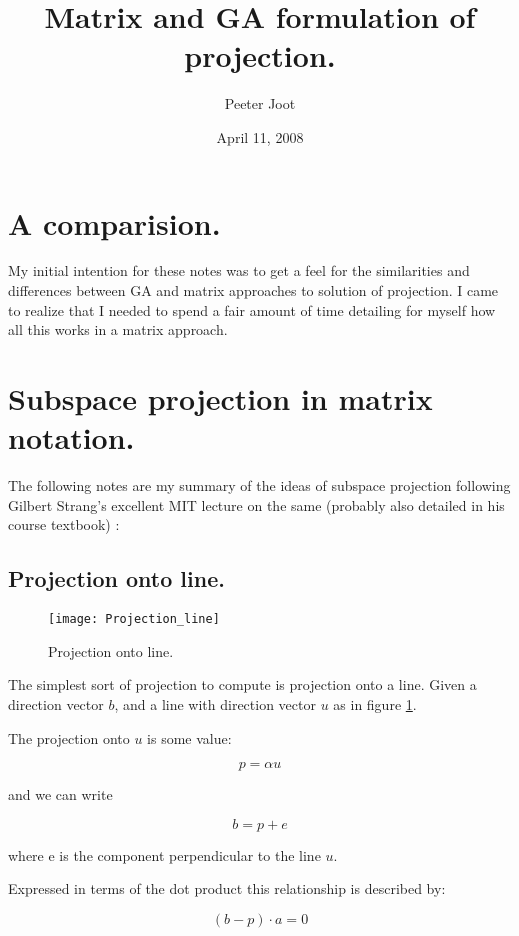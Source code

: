 \documentclass{article}      %
\title{ Matrix and GA formulation of projection. } %
\author{Peeter Joot}         %
\date{ April 11, 2008 }        %
\begin{document}

\maketitle{}

\section{ A comparision. }

My initial intention for these notes was to 
get a feel for the similarities and differences between GA and matrix approaches to solution of projection.  I came to realize that
I needed to spend a fair amount of time detailing for myself how all this works in a matrix approach.

\section{ Subspace projection in matrix notation. }

The following notes are my summary of the ideas of subspace projection following 
Gilbert Strang's excellent MIT lecture on the same (probably also detailed in his course textbook) :

\subsection{ Projection onto line. }

\begin{figure}[htp]
\centering
\texttt{[image: Projection\_line]}
\caption{Projection onto line.}\label{fig:Projection_line}
\end{figure}

The simplest sort of projection to compute is projection onto a line.  Given a direction vector $b$, and a line with direction vector $u$
as in figure \ref{fig:Projection_line}.

The projection onto $u$ is some value:

\[
p = \alpha u
\]

and we can write

\[
b = p + e
\]

where e is the component perpendicular to the line $u$.

Expressed in terms of the dot product this relationship is described by:

\[
(b - p) \cdot a = 0
\]
\end{document}
